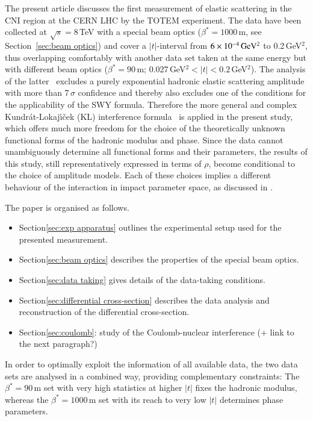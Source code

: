 The present article discusses the first measurement of elastic scattering in the
CNI region at the CERN LHC by the TOTEM experiment. 
The data have been collected at $\sqrt{s} = 8\,$TeV with a special beam optics 
($\beta^{*}=1000\,$m, see Section~\ref{sec:beam optics}) and cover a $|t|$-interval
from $6\times10^{-4}\,\rm GeV^{2}$ to 0.2\,GeV$^{2}$, thus overlapping comfortably
with another data set taken at the same energy but with different beam optics
($\beta^{*}=90\,$m; 0.027\,GeV$^{2} < |t| < 0.2\,$GeV$^{2}$). The analysis of the
latter~\cite{8tev-90m} excludes a purely exponential hadronic elastic scattering
amplitude with more than $7\,\sigma$ confidence and thereby also excludes
one of the conditions for the applicability of the SWY formula.
Therefore the more general and complex Kundr\'{a}t-Lokaj\'{\i}\v{c}ek (KL) interference 
formula~\cite{kl94} is applied in the present study, which offers much more freedom for the
choice of the theoretically unknown functional forms of the hadronic modulus 
and phase. Since the data cannot unambiguously determine all functional forms and their parameters, the results of this study, still representatively 
expressed in terms of $\rho$, become conditional to the choice of amplitude models. Each of these choices implies a different behaviour of the interaction in impact parameter space, as discussed in .

%
%

The paper is organised as follows.
\begin{itemize}
\item Section\ref{sec:exp apparatus} outlines the experimental setup used for the presented measurement.
\item Section\ref{sec:beam optics} describes the properties of the special beam optics.
\item Section\ref{sec:data taking} gives details of the data-taking conditions.
\item Section\ref{sec:differential cross-section} describes the data analysis and reconstruction of the differential cross-section.
\item Section\ref{sec:coulomb}: study of the Coulomb-nuclear interference (+ link to the next paragraph?)
\end{itemize}

In order to optimally exploit the information of all available data, the two 
data sets are analysed in a combined way, providing complementary constraints:
The $\beta^{*}=90\,$m set with very high statistics at higher $|t|$ fixes the 
hadronic modulus, whereas the $\beta^{*}=1000\,$m set with its reach to very low
$|t|$ determines phase parameters.

